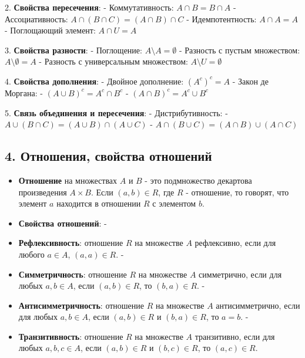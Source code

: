 \documentclass{article}
\begin{document}
2. \textbf{Свойства пересечения}:\hfill\break
   - Коммутативность: \( A \cap B = B \cap A \) \hfill\break
   - Ассоциативность: \( A \cap (B \cap C) = (A \cap B) \cap C \) \hfill\break
   - Идемпотентность: \( A \cap A = A \) \hfill\break
   - Поглощающий элемент: \( A \cap U = A \) \hfill\break

3. \textbf{Свойства разности}:\hfill\break
   - Поглощение: \( A \setminus A = \emptyset \) \hfill\break
   - Разность с пустым множеством: \( A \setminus \emptyset = A \) \hfill\break
   - Разность с универсальным множеством: \( A \setminus U = \emptyset \) \hfill\break

4. \textbf{Свойства дополнения}:\hfill\break
   - Двойное дополнение: \( (A^c)^c = A \) \hfill\break
   - Закон де Моргана:\hfill\break
     - \( (A \cup B)^c = A^c \cap B^c \)\hfill\break
     - \( (A \cap B)^c = A^c \cup B^c \)\hfill\break

5. \textbf{Связь объединения и пересечения}:\hfill\break
   - Дистрибутивность:\hfill\break
     - \( A \cup (B \cap C) = (A \cup B) \cap (A \cup C) \)\hfill\break
     - \( A \cap (B \cup C) = (A \cap B) \cup (A \cap C) \)\hfill\break
\pagebreak

\subsection*{4. Отношения, свойства отношений}
\begin{itemize}
\item \textbf{Отношение} на множествах \( A \) и \( B \) - это подмножество декартова произведения \( A \times B \). Если \( (a, b) \in R \), где \( R \) - отношение, то говорят, что элемент \( a \) находится в отношении \( R \) с элементом \( b \).

\item\textbf{Свойства отношений}:
- \item\textbf{Рефлексивность}: отношение \( R \) на множестве \( A \) рефлексивно, если для любого \( a \in A \), \( (a, a) \in R \).
- \item\textbf{Симметричность}: отношение \( R \) на множестве \( A \) симметрично, если для любых \( a, b \in A \), если \( (a, b) \in R \), то \( (b, a) \in R \).
- \item\textbf{Антисимметричность}: отношение \( R \) на множестве \( A \) антисимметрично, если для любых \( a, b \in A \), если \( (a, b) \in R \) и \( (b, a) \in R \), то \( a = b \).
- \item\textbf{Транзитивность}: отношение \( R \) на множестве \( A \) транзитивно, если для любых \( a, b, c \in A \), если \( (a, b) \in R \) и \( (b, c) \in R \), то \( (a, c) \in R \).
\end{itemize}
\end{document}
